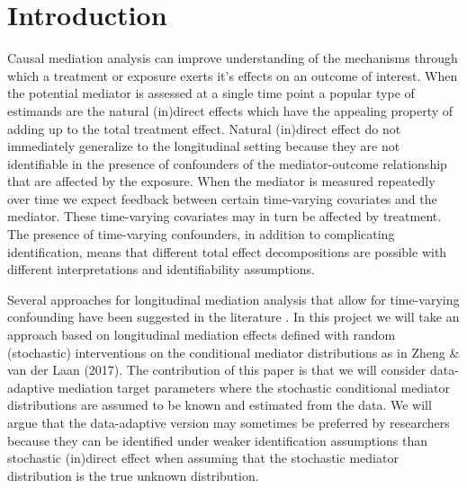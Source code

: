 \documentclass[AMA,STIX1COL]{WileyNJD-v2}
\begin{document}
\section{Introduction}\label{sec1}
Causal mediation analysis can improve understanding of the mechanisms through which a treatment or exposure exerts it's effects on an outcome of interest. When the potential mediator is assessed at a single time point a popular type of estimands are the natural (in)direct effects\citep{RobinsGreenland1992, Pearl2001} which have the appealing property of adding up to the total treatment effect. Natural (in)direct effect do not immediately generalize to the longitudinal setting because they are not identifiable in the presence of confounders of the mediator-outcome relationship that are affected by the exposure\citep{Avin2005}. When the mediator is measured repeatedly over time we expect feedback between certain time-varying covariates and the mediator. These time-varying covariates may in turn be affected by treatment. The presence of time-varying confounders, in addition to complicating identification, means that different total effect decompositions are possible with different interpretations and identifiability assumptions. 


Several approaches for longitudinal mediation analysis that allow for time-varying confounding have been suggested in the literature \citep{VanderweeleTchetgen2017, ZhengvdL2017, Vansteelandt2019}. In this project we will take an approach based on longitudinal mediation effects defined with random (stochastic) interventions on the conditional mediator distributions as in Zheng \& van der Laan (2017)\cite{ZhengvdL2017}. The contribution of this paper is that we will consider data-adaptive mediation target parameters where the stochastic conditional mediator distributions are assumed to be known and estimated from the data. We will argue that the data-adaptive version may sometimes be preferred by researchers because they can be identified under weaker identification assumptions than stochastic (in)direct effect when assuming that the stochastic mediator distribution is the true unknown distribution. 
\end{document}

